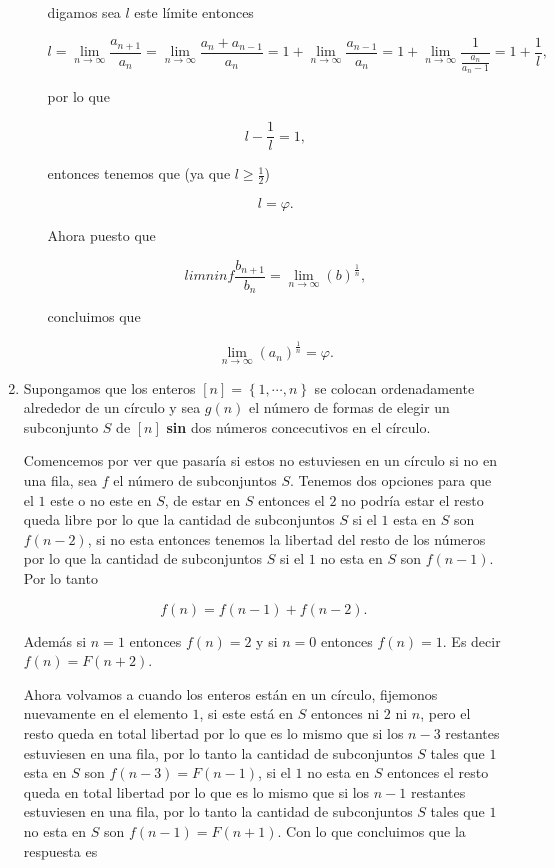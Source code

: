 \documentclass[letterpaper]{article}
\theoremstyle{definition}
\theoremstyle{lemathm}
\theoremstyle{lemademthm}
\newcommand{\limninf}{\lim_{n\to\infty}}
\newcommand{\pars}[1]{\left( #1 \right) }
\newcommand{\bracs}[1]{\left[ #1 \right] }
\newcommand{\set}[1]{\left \{ #1 \right\} }
\newcommand{\1}{\mathbbm{1}}
\begin{document}
\begin{enumerate}
\begin{enumerate}
			digamos sea $l$ este límite entonces

			\[l = \limninf \frac{a_{n+1}}{a_n} = \limninf \frac{a_{n} + a_{n-1}}{a_n} = 1 + \limninf \frac{a_{n-1}}{a_n} = 1 + \limninf \frac{1}{\frac{a_{n}}{a_n-1}} = 1 + \frac{1}{l},\]

			por lo que

			\[l - \frac{1}{l} = 1,\]

			entonces tenemos que (ya que $l \geq \frac{1}{2}$)

			\[l = \varphi.\]
			
			Ahora puesto que

			\[limninf \frac{b_{n+1}}{b_n} = \limninf \pars{b}^{\frac{1}{n}},\]

			concluimos que

			\[\limninf \pars{a_n}^{\frac{1}{n}} = \varphi.\]

		\end{enumerate}
		
		\item Supongamos que los enteros $\bracs{n} = \set{1,\cdots,n}$ se colocan ordenadamente alrededor de un círculo y sea $g(n)$ el número de formas de elegir un subconjunto $S$ de $\bracs{n}$ \textbf{sin} dos números concecutivos en el círculo. 
		
		Comencemos por ver que pasaría si estos no estuviesen en un círculo si no en una fila, sea $f$ el número de subconjuntos $S$. Tenemos dos opciones para que el $1$ este o no este en $S$, de estar en $S$ entonces el $2$ no podría estar el resto queda libre por lo que la cantidad de subconjuntos $S$ si el $1$ esta en $S$ son $f(n-2)$, si no esta entonces tenemos la libertad del resto de los números por lo que la cantidad de subconjuntos $S$ si el $1$ no esta en $S$ son $f(n-1)$. Por lo tanto

		\[f(n) = f(n-1) + f(n-2).\]

		Además si $n = 1$ entonces $f(n) = 2$ y si $n=0$ entonces $f(n) = 1$. Es decir $f(n) = F(n+2)$.

		Ahora volvamos a cuando los enteros están en un círculo, fijemonos nuevamente en el elemento $1$, si este está en $S$ entonces ni $2$ ni $n$, pero el resto queda en total libertad por lo que es lo mismo que si los $n-3$ restantes estuviesen en una fila, por lo tanto la cantidad de subconjuntos $S$ tales que $1$ esta en $S$ son $f(n-3) = F(n-1)$, si el $1$ no esta en $S$ entonces el resto queda en total libertad por lo que es lo mismo que si los $n-1$ restantes estuviesen en una fila, por lo tanto la cantidad de subconjuntos $S$ tales que $1$ no esta en $S$ son $f(n-1) = F(n+1)$. Con lo que concluimos que la respuesta es


\end{enumerate}
\end{document}
